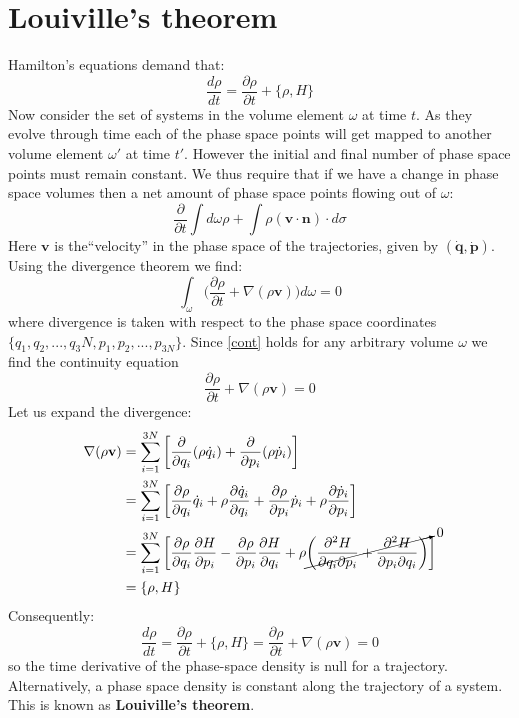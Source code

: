 \documentclass[a4paper,11pt,oneside]{book}
\begin{document}
\section{Louiville's theorem}
Hamilton's equations demand that:
\begin{equation}
    \frac{d\rho}{dt} = \frac{\partial \rho}{\partial t} + \{\rho, H\}
\end{equation}
Now consider the set of systems in the volume element $\omega$ at time $t$. As they evolve through time each of the phase space points will get mapped to another volume element $\omega'$ at time $t'$. However the initial and final number of phase space points must remain constant. We thus require that if we have a change in phase space volumes then a net amount of phase space points flowing out of $\omega$:
\begin{equation}
    \frac{\partial}{\partial t} \int d\omega \rho  + \int \rho (\textbf{v} \cdot \textbf{n}) \cdot d\sigma 
\end{equation}
Here $\textbf{v}$ is the\enquote{velocity} in the phase space of the trajectories, given by $(\dot{\textbf{q}}, \dot{\textbf{p}})$. Using the divergence theorem we find:
\begin{equation}\label{cont}
    \int_{\omega} \bigg(\frac{\partial \rho}{\partial t} + \nabla (\rho \textbf{v})\bigg) d\omega = 0
\end{equation}
where divergence is taken with respect to the phase space coordinates $\{q_1,q_2,...,q_3N, p_1, p_2,...,p_{3N}\}$. Since \eqref{cont} holds for any arbitrary volume $\omega$ we find the continuity equation
\begin{equation}
    \frac{\partial \rho}{\partial t} + \nabla (\rho \textbf{v})=0
\end{equation}
Let us expand the divergence:
\begin{align}
    \nabla (\rho \textbf{v}) &= \sum_{i=1}^{3N} \bigg[\frac{\partial}{\partial q_i} (\rho \dot{q}_i) + \frac{\partial}{\partial p_i} (\rho \dot{p}_i) \bigg]\\
    &=\sum_{i=1}^{3N} \bigg[\frac{\partial \rho}{\partial q_i} \dot{q}_i + \rho \frac{\partial \dot{q}_i}{\partial q_i} +  \frac{\partial \rho}{\partial p_i} \dot{p}_i + \rho \frac{\partial \dot{p}_i}{\partial p_i} \bigg]  \\
    &= \sum_{i=1}^{3N} \bigg[\frac{\partial \rho}{\partial q_i}\frac{\partial H}{\partial p_i} - \frac{\partial \rho}{\partial p_i} \frac{\partial H}{\partial q_i}+ \rho \cancelto{0}{\bigg( \frac{\partial^2H}{\partial q_i \partial p_i}+\frac{\partial^2 H}{\partial p_i \partial q_i}\bigg)} \bigg] \\
    &=\{\rho, H\}
\end{align}
Consequently:
\begin{equation}
    \boxed{\frac{d\rho}{dt} = \frac{\partial \rho}{\partial t} + \{\rho, H\} =\frac{\partial \rho}{\partial t} + \nabla (\rho \textbf{v}) = 0}
\end{equation}
so the time derivative of the phase-space density is null for a trajectory. Alternatively, a phase space density is constant along the trajectory of a system. This is known as \textbf{Louiville's theorem}. 
\end{document}
